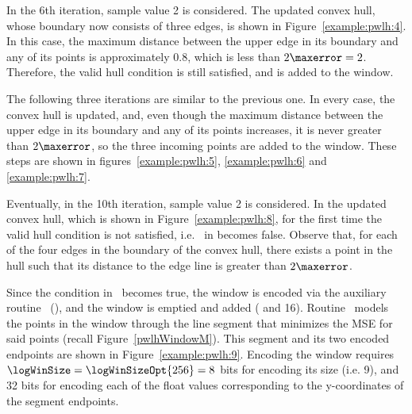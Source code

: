 

In the 6th iteration, sample value 2 is considered. The updated convex hull, whose boundary now consists of three edges, is shown in Figure~\ref{example:pwlh:4}. In this case, the maximum distance between the upper edge in its boundary and any of its points is approximately $0.8$, which is less than $2\maxerror=2$. Therefore, the valid hull condition is still satisfied, and  is added to the window.


\vspace{+5pt}


\clearpage


The following three iterations are similar to the previous one. In every case, the convex hull is updated, and, even though the maximum distance between the upper edge in its boundary and any of its points increases, it is never greater than $2\maxerror$, so the three incoming points are added to the window. These steps are shown in figures~\ref{example:pwlh:5}, \ref{example:pwlh:6} and \ref{example:pwlh:7}. 

\vspace{+5pt}

\vspace{-15pt}

\vspace{-15pt}

\clearpage


Eventually, in the 10th iteration, sample value 2 is considered. In the updated convex hull, which is shown in Figure~\ref{example:pwlh:8}, for the first time the valid hull condition is not satisfied, i.e. \validHull\ in  becomes false. Observe that, for each of the four edges in the boundary of the convex hull, there exists a point in the hull such that its distance to the edge line is greater than $2\maxerror$. 


\vspace{+5pt}


Since the condition in \condLinePWLH\ becomes true, the window is encoded via the auxiliary routine \EncodeWindow\ (), and the window is emptied and added  ( and 16). Routine \EncodeWindow\ models the points in the window through the line segment that minimizes the MSE for said points (recall Figure~\ref{pwlhWindowM}). This segment and its two encoded endpoints are shown in Figure~\ref{example:pwlh:9}. Encoding the window requires $\logWinSize = \logWinSizeOpt{256}=8$ bits for encoding its size (i.e. 9), and 32 bits for encoding each of the float values corresponding to the y-coordinates of the segment endpoints.


